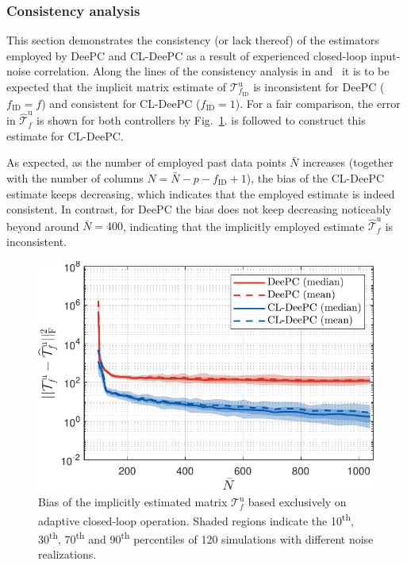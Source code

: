 \subsubsection{Consistency analysis}
\noindent This section demonstrates the consistency (or lack thereof) of the estimators employed by \ac{DeePC} and \ac{CL-DeePC} as a result of experienced closed-loop input-noise correlation. Along the lines of the consistency analysis in  and~\cite{Dinkla2023} it is to be expected that the implicit matrix estimate of $\mathcal{T}_{f_\mathrm{ID}}^\mathrm{u}$ is inconsistent for \ac{DeePC} ($f_\mathrm{ID}=f$) and consistent for \ac{CL-DeePC} ($f_\mathrm{ID}=1$). For a fair comparison, the error in $\widehat{\mathcal{T}}_f^\mathrm{u}$ is shown for both controllers by Fig.~\ref{fig:Tuf_consistency}.  is followed to construct this estimate for \ac{CL-DeePC}.

As expected, as the number of employed past data points $\bar{N}$ increases (together with the number of columns $N=\bar{N}-p-f_\mathrm{ID}+1$), the bias of the \ac{CL-DeePC} estimate keeps decreasing, which indicates that the employed estimate is indeed consistent. In contrast, for \ac{DeePC} the bias does not keep decreasing noticeably beyond around $\bar{N}=400$, indicating that the implicitly employed estimate $\widehat{\mathcal{T}}_f^\mathrm{u}$ is inconsistent.
\begin{figure}[b!]
\begin{center}
\includegraphics[width=\columnwidth]{results/figures/Consistency_Nbar_99-1039-50_p_20_f_20_Re_1_Ru_1_Rdu_0_Q_100_R_0_dR_10.pdf}    %
\caption{Bias of the implicitly estimated matrix $\mathcal{T}_f^\mathrm{u}$ based exclusively on adaptive closed-loop operation. Shaded regions indicate the 10\textsuperscript{th}, 30\textsuperscript{th}, 70\textsuperscript{th} and 90\textsuperscript{th} percentiles of 120 simulations with different noise realizations.}%
\label{fig:Tuf_consistency}                                 %
\end{center}                                 %
\end{figure}
